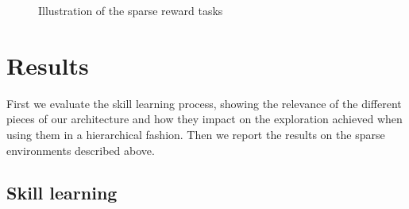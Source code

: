 \documentclass{article} %
\begin{document}
\begin{figure}[h!]
	\centering
	\caption{Illustration of the sparse reward tasks}
	\label{fig:snn_multimodal_MI}
\end{figure}


\section{Results}

First we evaluate the skill learning process, showing the relevance of the different pieces of our architecture and how they impact on the exploration achieved when using them in a hierarchical fashion. Then we report the results on the sparse environments described above.

\subsection{Skill learning}
\end{document}
